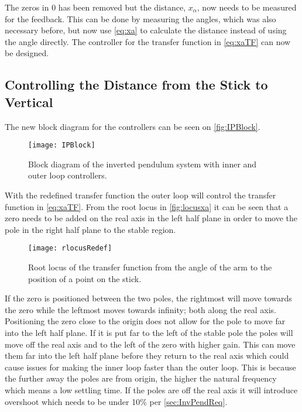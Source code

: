 The zeros in 0 has been removed but the distance, $x_\alpha$, now needs to be measured for the feedback. This can be done by measuring the angles, which was also necessary before, but now use \autoref{eq:xa} to calculate the distance instead of using the angle directly. The controller for the transfer function in \autoref{eq:xaTF} can now be designed.
\subsection{Controlling the Distance from the Stick to Vertical}
%
The new block diagram for the controllers can be seen on \autoref{fig:IPBlock}.
\begin{figure}[htbp]
\centering
\texttt{[image: IPBlock]}
\caption{Block diagram of the inverted pendulum system with inner and outer loop controllers.}
\label{fig:IPBlock}
\end{figure}
%

With the redefined transfer function the outer loop will control the transfer function in \autoref{eq:xaTF}. From the root locus in \autoref{fig:locusxa} it can be seen that a zero needs to be added on the real axis in the left half plane in order to move the pole in the right half plane to the stable region. 

\begin{figure}[htbp]
\centering
\texttt{[image: rlocusRedef]}
\caption{Root locus of the transfer function from the angle of the arm to the position of a point on the stick.}
\label{fig:locusxa}
\end{figure}

If the zero is positioned between the two poles, the rightmost will move towards the zero while the leftmost moves towards infinity; both along the real axis. Positioning the zero close to the origin does not allow for the pole to move far into the left half plane. If it is put far to the left of the stable pole the poles will move off the real axis and to the left of the zero with higher gain. This can move them far into the left half plane before they return to the real axis which could cause issues for making the inner loop faster than the outer loop. This is because the further away the poles are from origin, the higher the natural frequency which means a low settling time. If the poles are off the real axis it will introduce overshoot which needs to be under 10\% per \autoref{sec:InvPendReq}. 

